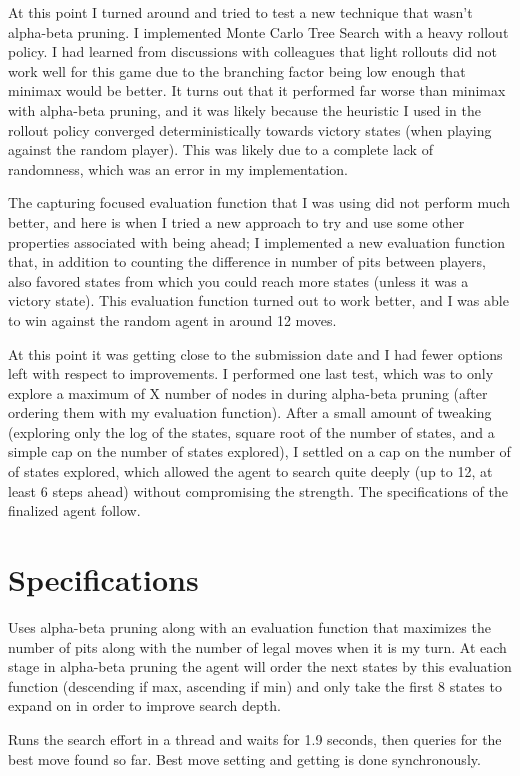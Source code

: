 \documentclass{article}
\begin{document}
At this point I turned around and tried to test a new technique that wasn't alpha-beta pruning. I implemented Monte Carlo Tree Search with a heavy rollout policy.
I had learned from discussions with colleagues that light rollouts did not work well for this game due to the branching factor being low enough that minimax would
be better. It turns out that it performed far worse than minimax with alpha-beta pruning, and it was likely because the heuristic I used in the rollout policy converged
deterministically towards victory states (when playing against the random player). This was likely due to a complete lack of randomness, which was an error in my implementation.

The capturing focused evaluation function that I was using did not perform much better, and here is when I tried a new approach to try and use some other properties associated with
being ahead; I implemented a new evaluation function that, in addition to counting the difference in number of pits between players, also favored states from which you could reach more states
(unless it was a victory state). This evaluation function turned out to work better, and I was able to win against the random agent in around 12 moves.

At this point it was getting close to the submission date and I had fewer options left with respect to improvements. I performed one last test, which was to
only explore a maximum of X number of nodes in during alpha-beta pruning (after ordering them with my evaluation function). After a small amount of tweaking (exploring only the log of the states,
square root of the number of states, and a simple cap on the number of states explored), I settled on a cap on the number of of states explored, which allowed the agent to search quite deeply
(up to 12, at least 6 steps ahead) without compromising the strength. The specifications of the finalized agent follow.

\section{Specifications}
Uses alpha-beta pruning along with an evaluation function that maximizes the number of pits along with the number of legal moves when it is my turn. At each stage in alpha-beta pruning
the agent will order the next states by this evaluation function (descending if max, ascending if min) and only take the first 8 states to expand on in order to improve search depth.

Runs the search effort in a thread and waits for 1.9 seconds, then queries for the best move found so far. Best move setting and getting is done synchronously.
\end{document}

